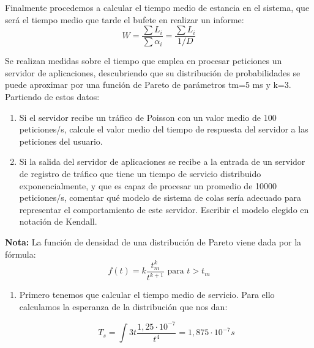 \begin{problem}[21]
\begin{enumerate}
Finalmente procedemos a calcular el tiempo medio de estancia en el sistema, que será el tiempo medio que tarde el bufete en realizar un informe:
\[W = \frac{\sum L_i}{\sum α_i}=\frac{\sum L_i}{1/D}\]
\end{enumerate}


\end{problem}

\begin{problem}[22]
Se realizan medidas sobre el tiempo que emplea en procesar peticiones un servidor de aplicaciones, descubriendo que su distribución de probabilidades se puede aproximar por una función de Pareto de parámetros tm=5 ms y k=3. Partiendo de estos datos:

\begin{enumerate}
\item Si el servidor recibe un tráfico de Poisson con un valor medio de 100 peticiones/s, calcule el valor medio del tiempo de respuesta del servidor a las peticiones del usuario.

\item Si la salida del servidor de aplicaciones se recibe a la entrada de un servidor de registro de tráfico que tiene un tiempo de servicio distribuido exponencialmente, y que es capaz de procesar un promedio de 10000 peticiones/s, comentar qué modelo de sistema de colas sería adecuado para representar el comportamiento de este servidor. Escribir el modelo elegido en notación de Kendall.

\end{enumerate}

\textbf{Nota: } La función de densidad de una distribución de Pareto viene dada por la fórmula:
\[f(t)=k\frac{t_m ^k}{t^{k+1}} \text{ para } t > t_m\]

\solution

\yoP


\begin{enumerate}
\item Primero tenemos que calcular el tiempo medio de servicio. Para ello calculamos la esperanza de la distribución que nos dan:

\[T_s = \int 3t \frac{1,25\cdot 10^{-7}}{t^4} = 1,875\cdot 10^{-7} s\]


\end{enumerate}
\end{problem}
